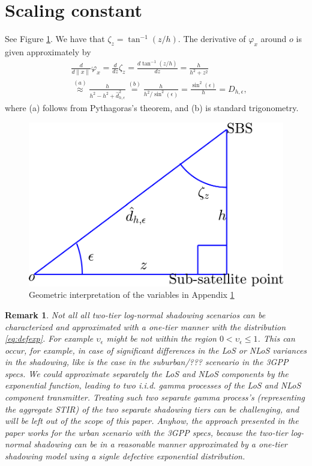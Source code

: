 \documentclass[lettersize,journal]{IEEEtran}
\newtheorem*{remark}{Remark}
\begin{document}
\section{Scaling constant}


\label{app:constantD}
See Figure \ref{fig:triangle}. We have that $\zeta_{z}= \tan^{-1}(z/h)$. The derivative of $\varphi_x$  around $\textit{o}$ is given approximately by
\begin{align}
  &\frac{d}{d \| x\|}\varphi_{x} =\frac{d}{dz}\zeta_{z}  = \frac{d\tan^{-1}(z/h)}{dz} = \frac{h}{h^2 + z^2}   \nonumber\\
  &\overset{(a)}{\approx} \frac{h}{h^2 -h^2 + \hat{d}^2_{h,\epsilon}}  \overset{(b)}{=}\frac{h}{ h^2/\sin^2(\epsilon)} = \frac{\sin^2(\epsilon)}{h} = D_{h,\epsilon},
\end{align}
where (a) follows from Pythagoras's theorem, and (b) is standard trigonometry.

\begin{figure}[h]
  \centering
  \includegraphics[width=0.7\linewidth]{triangle.pdf}
  \caption{Geometric interpretation of the variables in Appendix \ref{app:constantD} }
  \label{fig:triangle}
\end{figure}




\begin{remark}
  Not all all two-tier log-normal shadowing scenarios can be characterized and approximated with a one-tier manner with the distribution \eqref{eq:defexp}. For example $\upsilon_{\epsilon}$ might be not within the region $0<\upsilon_{\epsilon} \leq 1$. This can occur, for example, in case of significant differences in the LoS or NLoS variances in the shadowing, like is the case in the suburban/??? sceneario in the 3GPP specs. We could approximate separately the LoS and NLoS components by the exponential function, leading to two i.i.d. gamma processes of the LoS and NLoS component transmitter. Treating such two separate gamma process's (representing the aggregate STIR) of the two separate shadowing tiers can be challenging, and will be left out of the scope of this paper. Anyhow, the approach presented in the paper works for the urban scenario with the 3GPP specs, because the two-tier log-normal shadowing can be in a reasonable manner approximated by a one-tier shadowing model using a signle defective exponential distribution.
\end{remark}



%

\end{document}
